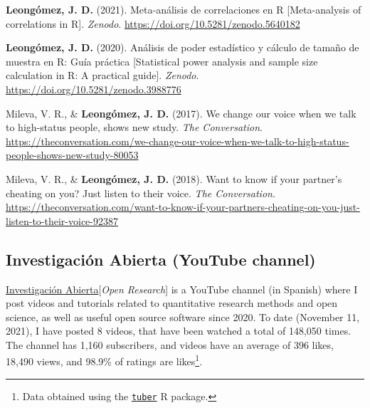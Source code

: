 \documentclass[11pt, a4paper]{awesome-cv}
\begin{document}
\begingroup
\setlength{\parindent}{-0.5in}
\setlength{\leftskip}{0.5in}

\hypertarget{refs_divulgation}{}
\leavevmode{}%
\textbf{Leongómez, J. D.} (2021). {Meta-análisis de correlaciones en R
{[}Meta-analysis of correlations in R{]}}. \emph{Zenodo}.
\url{https://doi.org/10.5281/zenodo.5640182}

\leavevmode{}%
\textbf{Leongómez, J. D.} (2020). {Análisis de poder estadístico y
cálculo de tamaño de muestra en R: Guía práctica {[}Statistical power
analysis and sample size calculation in R: A practical guide{]}}.
\emph{Zenodo}. \url{https://doi.org/10.5281/zenodo.3988776}

\leavevmode{}%
Mileva, V. R., \& \textbf{Leongómez, J. D.} (2017). {We change our voice
when we talk to high-status people, shows new study}. \emph{The
Conversation}.
\url{https://theconversation.com/we-change-our-voice-when-we-talk-to-high-status-people-shows-new-study-80053}

\leavevmode{}%
Mileva, V. R., \& \textbf{Leongómez, J. D.} (2018). {Want to know if
your partner's cheating on you? Just listen to their voice}. \emph{The
Conversation}.
\url{https://theconversation.com/want-to-know-if-your-partners-cheating-on-you-just-listen-to-their-voice-92387}

\endgroup

\hypertarget{section-4}{%
\subsection{\texorpdfstring{\textbf{Investigación Abierta (YouTube channel)}}{}}\label{section-4}}

\href{https://www.youtube.com/c/InvestigaciónAbierta}{\textcolor{red}{\faYoutubePlay}
Investigación Abierta}{[}\textit{Open Research}{]} is a YouTube channel
(in Spanish) where I post videos and tutorials related to quantitative
research methods and open science, as well as useful open source
software since 2020. To date (November 11, 2021), I have posted 8
videos, that have been watched a total of 148,050 times. The channel has
1,160 subscribers, and videos have an average of 396 likes, 18,490
views, and 98.9\% of ratings are likes\footnote{Data obtained using the
  \href{https://cran.r-project.org/web/packages/tuber/index.html}{\texttt{tuber}}
  R package.}.

\begingroup
\setlength{\parindent}{-0.5in}
\setlength{\leftskip}{0.5in}
\end{document}
